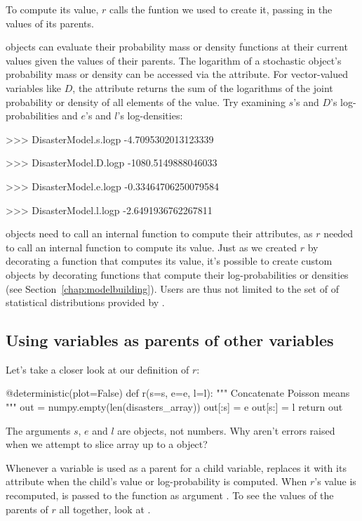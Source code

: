 \documentclass[]{jss}
\begin{document}
To compute its value, $r$ calls the funtion we used to create it, passing in the values of its parents.

 objects can evaluate their probability mass or density functions at their current values given the values of their parents. The logarithm of a stochastic object's probability mass or density can be accessed via the  attribute. For vector-valued variables like $D$, the  attribute returns the sum of the logarithms of the joint probability or density of all elements of the value. Try examining $s$'s and $D$'s log-probabilities and $e$'s and $l$'s log-densities:
\begin{CodeInput}
>>> DisasterModel.s.logp
-4.7095302013123339

>>> DisasterModel.D.logp
-1080.5149888046033

>>> DisasterModel.e.logp
-0.33464706250079584

>>> DisasterModel.l.logp
-2.6491936762267811
\end{CodeInput}
 objects need to call an internal function to compute their  attributes, as $r$ needed to call an internal function to compute its value. Just as we created $r$ by decorating a function that computes its value, it's possible to create custom  objects by decorating functions that compute their log-probabilities or densities (see Section~\ref{chap:modelbuilding}). Users are thus not limited to the set of of statistical distributions provided by .

\subsection{Using variables as parents of other variables}

Let's take a closer look at our definition of $r$:
\begin{CodeInput}
@deterministic(plot=False)
def r(s=s, e=e, l=l):
    """ Concatenate Poisson means """
    out = numpy.empty(len(disasters_array))
    out[:s] = e
    out[s:] = l
    return out
\end{CodeInput}
The arguments $s$, $e$ and $l$ are  objects, not numbers. Why aren't errors raised when we attempt to slice array  up to a  object?

Whenever a variable is used as a parent for a child variable,  replaces it with its  attribute when the child's value or log-probability is computed. When $r$'s value is recomputed,  is passed to the function as argument . To see the values of the parents of $r$ all together, look at .
\end{document}
